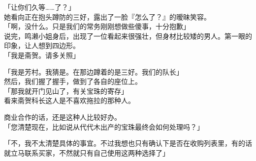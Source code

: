 「让你们久等……了？」\\

她看向正在抱头蹲防的三好，露出了一脸『怎么了？』的暧昧笑容。\\

「啊，没什么。只是我们的常务刚刚想做些傻事，十分抱歉」\\

说完，鸣濑小姐身后，出现了一位看起来很强壮，但身材比较矮的男人。第一眼的印象，让人想到四边形。\\

「我是斋贺。请多关照」

「我是芳村。我猜是。在那边蹲着的是三好。我们的队长」\\

然后，我们握了握手，做到了各自的座位上。\\

「那我就开门见山了，有关宝珠的寄存」\\

看来斋贺科长这人是不喜欢拖拉的那种人。

商业合作的话，还是这种人比较好办。\\

「您清楚现在，比如说从代代木出产的宝珠最终会如何处理吗？」

「不，我不太清楚具体的事宜。不过我想也只有确认下是否在收购列表里，有的话就立马联系买家，不然就只有自己使用这两种选择了」\\

